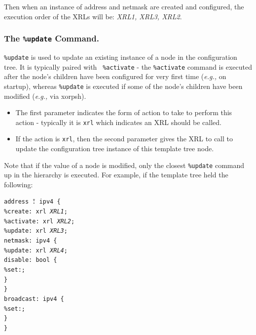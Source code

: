 \documentclass[11pt]{article}
\newcommand{\eg}{\emph{e.g.,}\xspace}
\begin{document}
Then when an instance of address and netmask are created and
configured, the execution order of the XRLs will be: {\it XRL1, XRL3, XRL2}.

\subsubsection{The {\tt \%update} Command.}
{\tt \%update} is used to update an existing instance of a
node in the configuration tree.  It is typically paired with {\tt
\%activate} - the {\tt \%activate} command is executed
after the node's children have been configured for very first time (\eg on
startup), whereas {\tt \%update} is executed if some of the node's children
have been modified (\eg via xorpsh).

\begin{itemize}

  \item The first parameter indicates the form of action to take to perform
this action - typically it is {\tt xrl} which indicates an XRL should
be called.

  \item If the action is {\tt xrl}, then the second parameter gives the XRL to
call to update the configuration tree instance of this template
tree node.

\end{itemize}

Note that if the value of a node is modified, only the closest {\tt \%update}
command up in the hierarchy is executed. For example, if the template tree
held the following:

\begin{tabbing}
\tt addr\=\tt ess \=\tt@: i\=\tt pv4 \{\\
    \>\tt\%create: xrl {\it XRL1};\\
    \>\tt\%activate: xrl {\it XRL2};\\
    \>\tt\%update: xrl {\it XRL3};\\
    \>\tt netmask: ipv4 \{\\
        \>\>\tt\%update: xrl {\it XRL4};\\
        \>\>\tt disable: bool \{\\
             \>\>\>\tt\%set:;\\
        \>\>\tt\}\\
    \>\tt\}\\
    \>\tt broadcast: ipv4 \{\\
        \>\>\tt\%set:;\\
    \>\tt\}\\
\tt\}
\end{tabbing}
\end{document}
